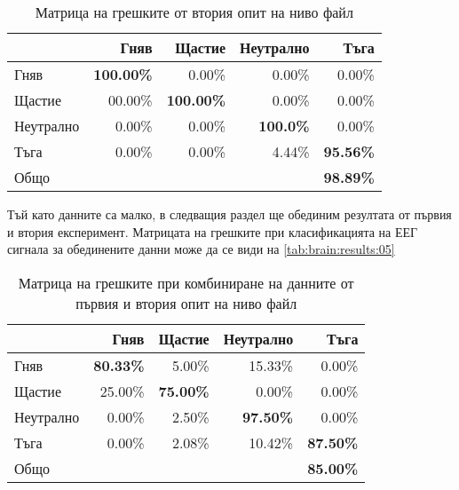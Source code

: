 \documentclass[main.tex]{subfiles}
\begin{document}
\begin{table}[h]
    \begin{center}
    \begin{tabular}{|l|r r r r|} 
        \hline
        & Гняв & Щастие & Неутрално & Тъга \\ 
        \hline
        Гняв &  \textbf{100.00\%} & 0.00\% & 0.00\% & 0.00\% \\ 
        Щастие & 00.00\% & \textbf{100.00\%} & 0.00\% & 0.00\% \\ 
        Неутрално & 0.00\% & 0.00\% & \textbf{100.0\%} & 0.00\% \\ 
        Тъга & 0.00\% & 0.00\% & 4.44\% & \textbf{95.56\%}\\ 
        \hline
        \hline
        Общо & & & & \textbf{98.89\%}\\
        \hline
    \end{tabular}
    \caption{Матрица на грешките от втория опит на ниво файл}
    \label{tab:brain:results:04}
    \end{center}
\end{table}

Тъй като данните са малко, в следващия раздел ще обединим резултата от първия и втория експеримент. Матрицата на грешките при класификацията на ЕЕГ сигнала за обединените данни може да се види на \autoref{tab:brain:results:05}

\begin{table}[h]
    \begin{center}
    \begin{tabular}{|l|r r r r|} 
        \hline
        & Гняв & Щастие & Неутрално & Тъга \\ 
        \hline
        Гняв &  \textbf{80.33\%} & 5.00\% & 15.33\% & 0.00\% \\ 
        Щастие & 25.00\% & \textbf{75.00\%} & 0.00\% & 0.00\% \\ 
        Неутрално & 0.00\% & 2.50\% & \textbf{97.50\%} & 0.00\% \\ 
        Тъга & 0.00\% & 2.08\% & 10.42\% & \textbf{87.50\%}\\ 
        \hline
        \hline
        Общо & & & & \textbf{85.00\%}\\
        \hline
    \end{tabular}
    \caption{Матрица на грешките при комбиниране на данните от първия и втория опит на ниво файл}
    \label{tab:brain:results:05}
    \end{center}
\end{table}
\end{document}
